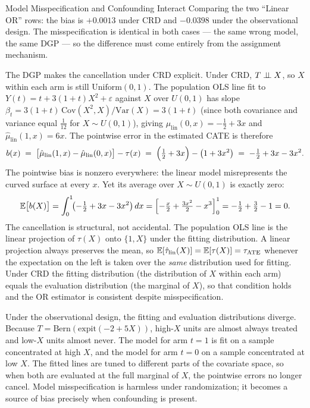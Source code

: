 \documentclass[master.tex]{subfiles}
\begin{document}
\begin{warn}{Model Misspecification and Confounding Interact}
Comparing the two ``Linear OR'' rows: the bias is $+0.0013$ under CRD
and $-0.0398$ under the observational design.  The misspecification is
identical in both cases --- the same wrong model, the same DGP --- so
the difference must come entirely from the assignment mechanism.

The DGP makes the cancellation under CRD explicit.  Under CRD,
$T \perp\!\!\!\perp X$, so $X$ within each arm is still $\mathrm{Uniform}(0,1)$.
The population OLS line fit to $Y(t) = t + 3(1+t)X^2 + \varepsilon$
against $X$ over $U(0,1)$ has slope
$\beta_t = 3(1+t)\,{\mathrm{Cov}(X^2,X)}/{\mathrm{Var}(X)} = 3(1+t)$
(since both covariance and variance equal $\tfrac{1}{12}$ for
$X\sim U(0,1)$), giving
$\hat\mu_{\mathrm{lin}}(0,x) = -\tfrac{1}{2}+3x$ and
$\hat\mu_{\mathrm{lin}}(1,x) = 6x$.
The pointwise error in the estimated CATE is therefore
\[
  b(x)
  \;=\;
  \bigl[\hat\mu_{\mathrm{lin}}(1,x) - \hat\mu_{\mathrm{lin}}(0,x)\bigr]
  - \tau(x)
  \;=\;
  \Bigl(\tfrac{1}{2}+3x\Bigr) - \bigl(1+3x^2\bigr)
  \;=\;
  -\tfrac{1}{2}+3x-3x^2.
\]
The pointwise bias is nonzero everywhere: the linear model
misrepresents the curved surface at every $x$.  Yet its average over
$X\sim U(0,1)$ is exactly zero:
\[
  \mathbb{E}\bigl[b(X)\bigr]
  = \int_0^1\!\bigl(-\tfrac{1}{2}+3x-3x^2\bigr)\,dx
  = \Bigl[-\tfrac{x}{2}+\tfrac{3x^2}{2}-x^3\Bigr]_0^1
  = -\tfrac{1}{2}+\tfrac{3}{2}-1 = 0.
\]
The cancellation is structural, not accidental.  The population OLS
line is the linear projection of $\tau(X)$ onto $\{1, X\}$ under the
fitting distribution.  A linear projection always preserves the mean,
so $\mathbb{E}[\hat\tau_{\mathrm{lin}}(X)] = \mathbb{E}[\tau(X)] = \tau_{\mathrm{ATE}}$
whenever the expectation on the left is taken over the \emph{same}
distribution used for fitting.  Under CRD the fitting distribution
(the distribution of $X$ within each arm) equals the evaluation
distribution (the marginal of $X$), so that condition holds and the
OR estimator is consistent despite misspecification.

Under the observational design, the fitting and evaluation distributions
diverge.  Because $T = \mathrm{Bern}(\mathrm{expit}(-2+5X))$, high-$X$
units are almost always treated and low-$X$ units almost never.  The
model for arm $t=1$ is fit on a sample concentrated at high $X$, and
the model for arm $t=0$ on a sample concentrated at low $X$.  The
fitted lines are tuned to different parts of the covariate space, so
when both are evaluated at the full marginal of $X$, the pointwise
errors no longer cancel.  Model misspecification is harmless under
randomization; it becomes a source of bias precisely when confounding
is present.
\end{warn}
\end{document}
